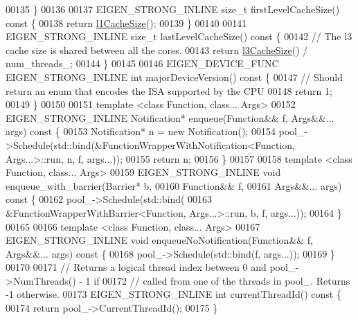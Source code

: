\begin{DoxyCode}
00135   \}
00136 
00137   EIGEN\_STRONG\_INLINE \textcolor{keywordtype}{size\_t} firstLevelCacheSize()\textcolor{keyword}{ const }\{
00138     \textcolor{keywordflow}{return} \hyperlink{namespace_eigen_a2669f89ff38296a38e6d973552eb4e33}{l1CacheSize}();
00139   \}
00140 
00141   EIGEN\_STRONG\_INLINE \textcolor{keywordtype}{size\_t} lastLevelCacheSize()\textcolor{keyword}{ const }\{
00142     \textcolor{comment}{// The l3 cache size is shared between all the cores.}
00143     \textcolor{keywordflow}{return} \hyperlink{namespace_eigen_ae2efa4852ea90c2d47b7dcec5b40ba2b}{l3CacheSize}() / num\_threads\_;
00144   \}
00145 
00146   EIGEN\_DEVICE\_FUNC EIGEN\_STRONG\_INLINE \textcolor{keywordtype}{int} majorDeviceVersion()\textcolor{keyword}{ const }\{
00147     \textcolor{comment}{// Should return an enum that encodes the ISA supported by the CPU}
00148     \textcolor{keywordflow}{return} 1;
00149   \}
00150 
00151   \textcolor{keyword}{template} <\textcolor{keyword}{class }Function, \textcolor{keyword}{class}... Args>
00152   EIGEN\_STRONG\_INLINE Notification* enqueue(Function&& f, Args&&... args)\textcolor{keyword}{ const }\{
00153     Notification* n = \textcolor{keyword}{new} Notification();
00154     pool\_->Schedule(std::bind(&FunctionWrapperWithNotification<Function, Args...>::run, n, f, args...));
00155     \textcolor{keywordflow}{return} n;
00156   \}
00157 
00158   \textcolor{keyword}{template} <\textcolor{keyword}{class }Function, \textcolor{keyword}{class}... Args>
00159   EIGEN\_STRONG\_INLINE \textcolor{keywordtype}{void} enqueue\_with\_barrier(Barrier* b,
00160                                                 Function&& f,
00161                                                 Args&&... args)\textcolor{keyword}{ const }\{
00162     pool\_->Schedule(std::bind(
00163         &FunctionWrapperWithBarrier<Function, Args...>::run, b, f, args...));
00164   \}
00165 
00166   \textcolor{keyword}{template} <\textcolor{keyword}{class }Function, \textcolor{keyword}{class}... Args>
00167   EIGEN\_STRONG\_INLINE \textcolor{keywordtype}{void} enqueueNoNotification(Function&& f, Args&&... args)\textcolor{keyword}{ const }\{
00168     pool\_->Schedule(std::bind(f, args...));
00169   \}
00170 
00171   \textcolor{comment}{// Returns a logical thread index between 0 and pool\_->NumThreads() - 1 if}
00172   \textcolor{comment}{// called from one of the threads in pool\_. Returns -1 otherwise.}
00173   EIGEN\_STRONG\_INLINE \textcolor{keywordtype}{int} currentThreadId()\textcolor{keyword}{ const }\{
00174     \textcolor{keywordflow}{return} pool\_->CurrentThreadId();
00175   \}

\end{DoxyCode}
